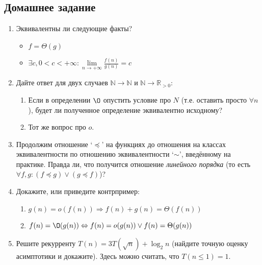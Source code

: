 \subsection{Домашнее задание}
\begin{enumerate}
  \item	
	Эквивалентны ли следующие факты?
	\begin{itemize}
		\item $f = \Theta(g)$
		\item $\exists c,  0 < c < +\infty : \lim\limits_{n \to +\infty} \frac{f(n)}{g(n)} = c$
	\end{itemize}

  \item
    Дайте ответ для двух случаев $\mathbb{N} \to \mathbb{N}$ и $\mathbb{N} \to \mathbb{R}_{>0}$:
    \begin{enumerate}
      \item
        Если в определении $\O$ опустить условие про $N$ (т.е. оставить
        просто $\forall n$), будет ли полученное определение эквивалентно
        исходному?
      \item
        Тот же вопрос про $o$.
    \end{enumerate}

  \item
    Продолжим отношение `$\preceq$' на функциях до отношения на классах эквивалентности по отношению эквивалентности `$\sim$', введённому на практике. Правда ли, что получится отношение \textit{линейного порядка} (то есть $\forall f, g: (f \preceq g) \lor (g \preceq f)$)?

  \item
    Докажите, или приведите контрпример:
    \begin{enumerate}
      \item $g(n) = o(f(n)) \Rightarrow f(n) + g(n) = \Theta(f(n))$
      \item $f(n) = \O(g(n)) \Leftrightarrow f(n) = o(g(n)) \lor f(n) = \Theta(g(n))$
    \end{enumerate}

	\item
Решите рекурренту $T(n) = 3 T(\sqrt{n}) + \log_2 n$ (найдите точную оценку асимптотики и докажите). Здесь можно считать, что $T(n \le 1) = 1$.


\end{enumerate}
